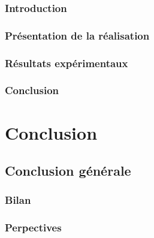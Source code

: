 \documentclass[french]{spimumlpphdthesis}
\begin{document}
\section{Introduction}

\section{Présentation de la réalisation}

\section{Résultats expérimentaux}

\section{Conclusion}

\part{Conclusion}

\chapter{Conclusion générale}
 
\section{Bilan}

\section{Perpectives}
 
\backmatter
 
 
 
 
 
 
\end{document}
